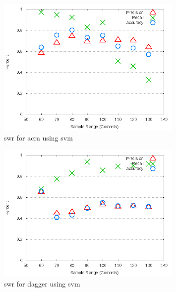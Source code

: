 \begin{figure}[!ht]
    \centering

        \includegraphics[width=0.8\textwidth]{images/svm/test_1/acra_sample_range}
        \caption{\gls{swr} for acra using \gls{svm}}
        \label{fig:test_1_acra_svm}
\end{figure}

\begin{figure}[!ht]
    \centering
        \includegraphics[width=0.8\textwidth]{images/svm/test_1/dagger_sample_range}
        \caption{\gls{swr} for dagger using \gls{svm}}
        \label{fig:test_1_dagger_svm}
\end{figure}



